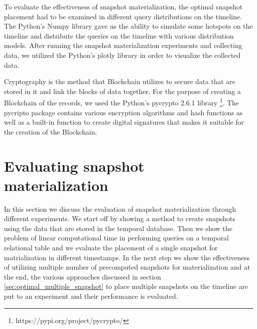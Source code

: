 		To evaluate the effectiveness of snapshot materialization, the optimal snapshot placement had to be examined in different query distributions on the timeline. The Python's Numpy library gave us the ability to simulate some hotspots on the timeline and distribute the queries on the timeline with various distribution models. After running the snapshot materialization experiments and collecting data, we utilized the Python's plotly library in order to visualize the collected data.

		Cryptography is the method that Blockchain utilizes to secure data that are stored in it and link the blocks of data together. For the purpose of creating a Blockchain of the records, we used the Python's pycrypto 2.6.1 library \footnote{https://pypi.org/project/pycrypto/}. The pycripto package contains various encryption algorithms and hash functions as well as a built-in function to create digital signatures that makes it suitable for the creation of the Blockchain.

	\section{Evaluating snapshot materialization} \label{sec:evaluation_of_snapshot_materialization}
		In this section we discuss the evaluation of snapshot materialization through different experiments. We start off by showing a method to create snapshots using the data that are stored in the temporal database. Then we show the problem of linear computational time in performing queries on a temporal relational table and we evaluate the placement of a single snapshot for matrialization in different timestamps. In the next step we show the effectiveness of utilizing multiple number of precomputed snapshots for materialization and at the end, the various approaches discussed in section \ref{sec:optimal_multiple_snapshot} to place multiple snapshots on the timeline are put to an experiment and their performance is evaluated.

